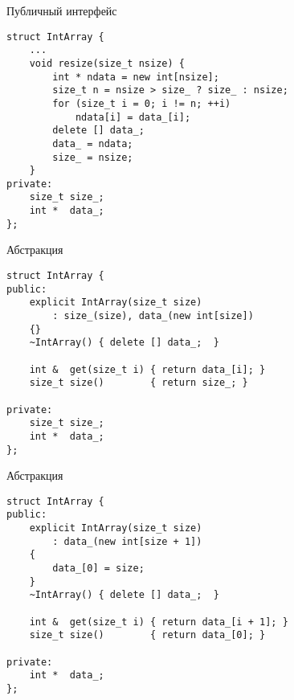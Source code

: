 \documentclass{beamer}
\begin{document}
\begin{frame}[fragile]{Публичный интерфейс}{}
\begin{lstlisting}
struct IntArray {
    ...
    void resize(size_t nsize) {
        int * ndata = new int[nsize];
        size_t n = nsize > size_ ? size_ : nsize;
        for (size_t i = 0; i != n; ++i)
            ndata[i] = data_[i];
        delete [] data_;
        data_ = ndata;
        size_ = nsize;
    }
private:
    size_t size_;
    int *  data_;
};
\end{lstlisting}
\end{frame}

\begin{frame}[fragile]{Абстракция}{}
\begin{lstlisting}
struct IntArray {
public:
    explicit IntArray(size_t size) 
        : size_(size), data_(new int[size]) 
    {}
    ~IntArray() { delete [] data_;  }

    int &  get(size_t i) { return data_[i]; }
    size_t size()        { return size_; }

private:
    size_t size_;
    int *  data_;
};
\end{lstlisting}
\end{frame}

\begin{frame}[fragile]{Абстракция}{}
\begin{lstlisting}
struct IntArray {
public:
    explicit IntArray(size_t size) 
        : data_(new int[size + 1]) 
    {
        data_[0] = size;
    }
    ~IntArray() { delete [] data_;  }

    int &  get(size_t i) { return data_[i + 1]; }
    size_t size()        { return data_[0]; }

private:
    int *  data_;
};
\end{lstlisting}
\end{frame}
\end{document}
